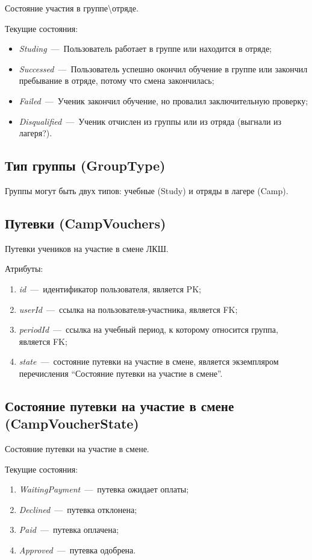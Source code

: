 \documentclass[14pt]{article}
\begin{document}
Состояние участия в группе\textbackslash отряде.

Текущие состояния:
\begin{itemize}
	\item \emph{Studing}~---~Пользователь работает в группе или находится в отряде; 
	\item \emph{Successed}~---~Пользователь успешно окончил обучение в группе или закончил пребывание в отряде, потому что смена закончилась;
	\item \emph{Failed}~---~Ученик закончил обучение, но провалил заключительную проверку;
	\item \emph{Disqualified}~---~Ученик отчислен из группы или из отряда (выгнали из лагеря?).
\end{itemize}

\subsection{Тип группы (GroupType)}

Группы могут быть двух типов: учебные (Study) и отряды в лагере (Camp).

\subsection{Путевки (CampVouchers)}

Путевки учеников на участие в смене ЛКШ.

Атрибуты:
\begin{enumerate}
	\item \emph{id}~---~идентификатор пользователя, является PK; 
	\item \emph{userId}~---~ссылка на пользователя-участника, является FK;
	\item \emph{periodId}~---~ссылка на учебный период, к которому относится группа, является FK;
	\item \emph{state}~---~состояние путевки на участие в смене, является экземпляром перечисления ``Состояние путевки на участие в смене''. 
\end{enumerate}

\subsection{Состояние путевки на участие в смене (CampVoucherState)}

Состояние путевки на участие в смене.

Текущие состояния:

\begin{enumerate}
	\item \emph{WaitingPayment}~---~путевка ожидает оплаты;
	\item \emph{Declined}~---~путевка отклонена;
	\item \emph{Paid}~---~путевка оплачена;
	\item \emph{Approved}~---~путевка одобрена.
\end{enumerate}
\end{document}
